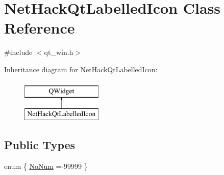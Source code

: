 \hypertarget{classNetHackQtLabelledIcon}{\section{Net\+Hack\+Qt\+Labelled\+Icon Class Reference}
\label{classNetHackQtLabelledIcon}
}


{\ttfamily \#include $<$qt\+\_\+win.\+h$>$}

Inheritance diagram for Net\+Hack\+Qt\+Labelled\+Icon\+:\begin{figure}[H]
\begin{center}
\leavevmode
\includegraphics[height=2.000000cm]{classNetHackQtLabelledIcon}
\end{center}
\end{figure}
\subsection*{Public Types}
\begin{DoxyCompactItemize}
\item 
enum \{ \hyperlink{classNetHackQtLabelledIcon_a1712089bb1061d18f71a3e781772027cae97b25166159ca49a60ef920bdfe57cb}{No\+Num} =-\/99999
 \}
\end{DoxyCompactItemize}
